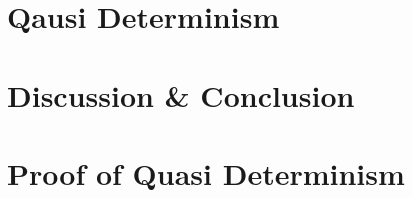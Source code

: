 \documentclass{kththesis}
\begin{document}





\chapter{Qausi Determinism}
\label{cha:determinism}


\chapter{Discussion \& Conclusion}
\label{cha:disc_concl}


\printbibliography[heading=bibintoc] %

\appendix



\chapter{Proof of Quasi Determinism}
\end{document}
